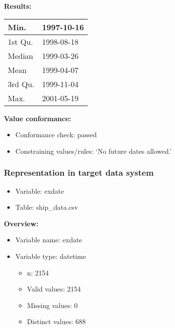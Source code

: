 \documentclass[
]{article}
\providecommand{\tightlist}{%
  \setlength{\itemsep}{0pt}\setlength{\parskip}{0pt}}
\begin{document}
\textbf{Results:}\\

\begin{table}[H]
\centering
\begin{tabular}{l|l}
\hline
Min. & 1997-10-16\\
\hline
1st Qu. & 1998-08-18\\
\hline
Median & 1999-03-26\\
\hline
Mean & 1999-04-07\\
\hline
3rd Qu. & 1999-11-04\\
\hline
Max. & 2001-05-19\\
\hline
\end{tabular}
\end{table}

\textbf{Value conformance:}

\begin{itemize}
\tightlist
\item
  Conformance check: passed
\item
  Constraining values/rules: `No future dates allowed.'
\end{itemize}

\newpage

\hypertarget{representation-in-target-data-system-10}{%
\subsubsection{\texorpdfstring{Representation in \textbf{target} data
system}{Representation in target data system}}\label{representation-in-target-data-system-10}}

\begin{itemize}
\tightlist
\item
  Variable: exdate
\item
  Table: ship\_data.csv
\end{itemize}

\textbf{Overview:}

\begin{itemize}
\tightlist
\item
  Variable name: exdate
\item
  Variable type: datetime

  \begin{itemize}
  \tightlist
  \item
    n: 2154
  \item
    Valid values: 2154
  \item
    Missing values: 0
  \item
    Distinct values: 688
  \end{itemize}
\end{itemize}
\end{document}
